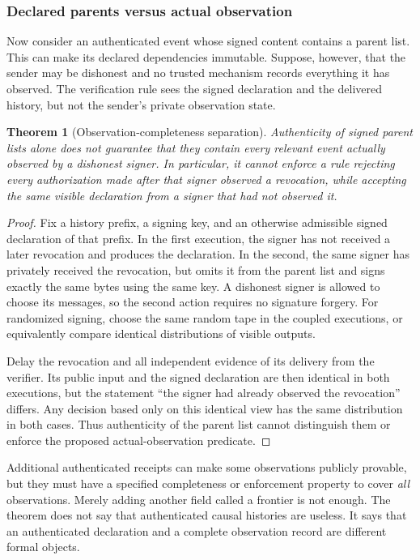 \documentclass[11pt]{article}
\newtheorem{theorem}{Theorem}[section]
\theoremstyle{definition}
\begin{document}
\subsubsection{Declared parents versus actual observation}
Now consider an authenticated event whose signed content contains a parent list. This can make its declared dependencies immutable. Suppose, however, that the sender may be dishonest and no trusted mechanism records everything it has observed. The verification rule sees the signed declaration and the delivered history, but not the sender's private observation state.

\begin{theorem}[Observation-completeness separation]\label{thm:omission}
Authenticity of signed parent lists alone does not guarantee that they contain every relevant event actually observed by a dishonest signer. In particular, it cannot enforce a rule rejecting every authorization made after that signer observed a revocation, while accepting the same visible declaration from a signer that had not observed it.
\end{theorem}
\begin{proof}
Fix a history prefix, a signing key, and an otherwise admissible signed declaration of that prefix. In the first execution, the signer has not received a later revocation and produces the declaration. In the second, the same signer has privately received the revocation, but omits it from the parent list and signs exactly the same bytes using the same key. A dishonest signer is allowed to choose its messages, so the second action requires no signature forgery. For randomized signing, choose the same random tape in the coupled executions, or equivalently compare identical distributions of visible outputs.

Delay the revocation and all independent evidence of its delivery from the verifier. Its public input and the signed declaration are then identical in both executions, but the statement ``the signer had already observed the revocation'' differs. Any decision based only on this identical view has the same distribution in both cases. Thus authenticity of the parent list cannot distinguish them or enforce the proposed actual-observation predicate.
\end{proof}

Additional authenticated receipts can make some observations publicly provable, but they must have a specified completeness or enforcement property to cover \emph{all} observations. Merely adding another field called a frontier is not enough. The theorem does not say that authenticated causal histories are useless. It says that an authenticated declaration and a complete observation record are different formal objects.
\end{document}
